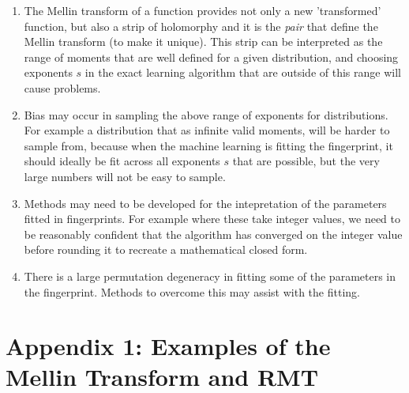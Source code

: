 \documentclass{article}
\begin{document}
\begin{enumerate}
\item The Mellin transform of a function provides not only a new 'transformed' function, but also a strip of holomorphy and it is the \emph{pair} that define the Mellin transform (to make it unique). This strip can be interpreted as the range of moments that are well defined for a given distribution, and choosing exponents $s$ in the exact learning algorithm that are outside of this range will cause problems.
\item Bias may occur in sampling the above range of exponents for distributions. For example a distribution that as infinite valid moments, will be harder to sample from, because when the machine learning is fitting the fingerprint, it should ideally be fit across all exponents $s$ that are possible, but the very large numbers will not be easy to sample.
\item Methods may need to be developed for the intepretation of the parameters fitted in fingerprints. For example where these take integer values, we need to be reasonably confident that the algorithm has converged on the integer value before rounding it to recreate a mathematical closed form.
\item There is a large permutation degeneracy in fitting some of the parameters in the fingerprint. Methods to overcome this may assist with the fitting.
\end{enumerate}


\section{Appendix 1: Examples of the Mellin Transform and RMT}
\end{document}
